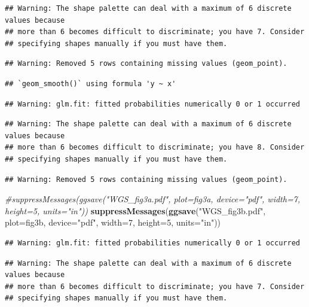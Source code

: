 \documentclass[
]{article}
\newenvironment{Shaded}{\begin{snugshade}}{\end{snugshade}}
\newcommand{\CommentTok}[1]{\textcolor[rgb]{0.56,0.35,0.01}{\textit{#1}}}
\newcommand{\DataTypeTok}[1]{\textcolor[rgb]{0.13,0.29,0.53}{#1}}
\newcommand{\DecValTok}[1]{\textcolor[rgb]{0.00,0.00,0.81}{#1}}
\newcommand{\KeywordTok}[1]{\textcolor[rgb]{0.13,0.29,0.53}{\textbf{#1}}}
\newcommand{\NormalTok}[1]{#1}
\newcommand{\StringTok}[1]{\textcolor[rgb]{0.31,0.60,0.02}{#1}}
\begin{document}
\begin{verbatim}
## Warning: The shape palette can deal with a maximum of 6 discrete values because
## more than 6 becomes difficult to discriminate; you have 7. Consider
## specifying shapes manually if you must have them.
\end{verbatim}

\begin{verbatim}
## Warning: Removed 5 rows containing missing values (geom_point).
\end{verbatim}

\begin{verbatim}
## `geom_smooth()` using formula 'y ~ x'
\end{verbatim}

\begin{verbatim}
## Warning: glm.fit: fitted probabilities numerically 0 or 1 occurred
\end{verbatim}

\begin{verbatim}
## Warning: The shape palette can deal with a maximum of 6 discrete values because
## more than 6 becomes difficult to discriminate; you have 8. Consider
## specifying shapes manually if you must have them.
\end{verbatim}

\begin{verbatim}
## Warning: Removed 5 rows containing missing values (geom_point).
\end{verbatim}

\begin{Shaded}
\begin{Highlighting}[]
\CommentTok{#suppressMessages(ggsave("WGS_fig3a.pdf", plot=fig3a, device="pdf", width=7, height=5, units="in"))}
\KeywordTok{suppressMessages}\NormalTok{(}\KeywordTok{ggsave}\NormalTok{(}\StringTok{"WGS_fig3b.pdf"}\NormalTok{, }\DataTypeTok{plot=}\NormalTok{fig3b, }\DataTypeTok{device=}\StringTok{"pdf"}\NormalTok{, }\DataTypeTok{width=}\DecValTok{7}\NormalTok{, }\DataTypeTok{height=}\DecValTok{5}\NormalTok{, }\DataTypeTok{units=}\StringTok{"in"}\NormalTok{))}
\end{Highlighting}
\end{Shaded}

\begin{verbatim}
## Warning: glm.fit: fitted probabilities numerically 0 or 1 occurred
\end{verbatim}

\begin{verbatim}
## Warning: The shape palette can deal with a maximum of 6 discrete values because
## more than 6 becomes difficult to discriminate; you have 7. Consider
## specifying shapes manually if you must have them.
\end{verbatim}
\end{document}
